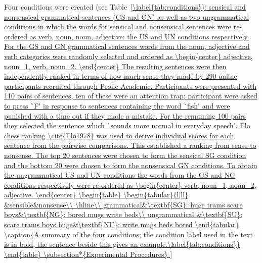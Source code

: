 \documentclass[a4paper,10pt,twoside]{article}
\begin{document}
Four conditions were created (see Table~\ref{\label{tab:conditions}): sensical and nonsensical
grammatical sentences (GS and GN) as well as two ungrammatical
conditions in which the words for sensical and nonsensical sentences
were re-ordered as verb, noun, noun, adjective: the US and UN
conditions respectively. For the GS and GN grammatical sentences words
from the noun, adjective and verb categories were randomly selected
and ordered as
\begin{center}
  adjective, noun_1, verb, noun_2.
\end{center}
The resulting sentences were then independently ranked in terms of how
much sense they made by 290 online participants recruited through
Prolic Academic. Participants were presented with 110 pairs of
sentences, ten of these were an attention trap; participant were asked
to press `F' in response to sentences containing the word `fish' and
were punished with a time out if they made a mistake. For the
remaining 100 pairs they selected the sentence which `sounds more
normal in everyday speech'. Elo chess ranking \cite{Elo1978} was used
to derive individual scores for each sentence from the pairwise
comparisons. This established a ranking from sense to nonsense. The
top 20 sentences were chosen to form the sensical SG condition and the
bottom 20 were chosen to form the nonsensical GN conditions.  To
obtain the ungrammatical US and UN conditions the words from the GS
and NG conditions respectively were re-ordered as
\begin{center}
verb, noun_1, noun_2, adjective.
\end{center}

\begin{table}
\begin{tabular}{l|ll}
&sensible&nonsense\\
\hline\\
grammatical&\textbf{SG}: huge trams scare boys&\textbf{NG}: bored mugs write beds\\
ungrammatical &\textbf{SU}: scare trams boys huge&\textbf{NU}: write mugs beds bored
\end{tabular}
\caption{A summary of the four conditions; the condition label used in the text is in
  bold, the sentence beside this gives an
  example.\label{tab:conditions}}
\end{table}

\subsection*{Experimental Procedures}

}
\end{document}
